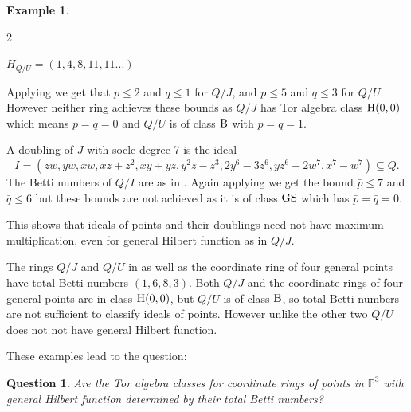 \documentclass[reqno]{amsart}
\newcommand{\sube}{\subseteq}
\renewcommand{\P}{\mathbb{P}}
\renewcommand{\H}{{\rm H}}
\newcommand{\B}{{\rm B}}
\newcommand{\GS}{{\rm GS}}
\theoremstyle{plain} %
\newtheorem{quest}[theorem]{Question}
\theoremstyle{definition}
\newtheorem{example}[theorem]{Example}
\theoremstyle{remark}
\begin{document}
\begin{example}
\begin{multicols}{2}
       \vspace{5pt}
       
      $H_{Q/U}=(1,4,8,11,11...)$
    \end{multicols}
    
    
Applying  we get that $p
\leq 2$ and $q\leq 1$ for $Q/J$, and $p\leq 5$ and $q\leq 3$ for $Q/U$. However neither ring achieves these bounds as $Q/J$ has Tor algebra class $\H(0,0)$ which means $p=q=0$ and $Q/U$ is of class $\B$ with $p=q=1$.

A doubling of $J$ with socle degree 7 is the ideal 
\[I=(zw,yw,xw,xz+z^2,xy+yz,y^2z-z^3, 2y^6-3z^6,yz^6-2w^7,x^7-w^7)\sube Q.\] The Betti numbers of $Q/I$ are as in .
Again applying  we get the bound $\bar p\leq 7$ and $\bar q\leq 6$ but these bounds are not achieved as it is of class $\GS$ which has $\bar p=\bar q=0$. 
\end{example}

This shows that ideals of points and their doublings need not have maximum multiplication, even for general Hilbert function as in $Q/J$.

The rings $Q/J$ and $Q/U$ in  as well as the coordinate ring of four general points have total Betti numbers $(1,6,8,3)$. Both $Q/J$ and the coordinate rings of four general points are in class $\H(0,0)$, but $Q/U$ is of class $\B$, so total Betti numbers are not sufficient to classify ideals of points. However unlike the other two $Q/U$ does not not have general Hilbert function.



These examples lead to the question:

\begin{quest}
    Are the Tor algebra classes for coordinate rings of points in $\P^3$ with general Hilbert function determined by their total Betti numbers? 
\end{quest}





\end{document}
